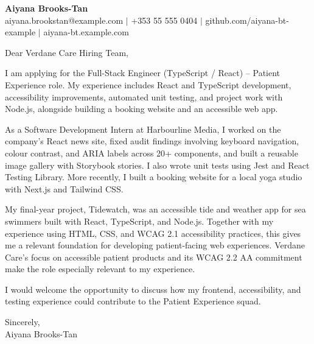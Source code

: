 \documentclass[11pt,a4paper]{article}
\begin{document}
{\large\bfseries Aiyana Brooks-Tan}\\
aiyana.brookstan@example.com $\mid$ +353 55 555 0404 $\mid$ github.com/aiyana-bt-example $\mid$ aiyana-bt.example.com

Dear Verdane Care Hiring Team,

I am applying for the Full-Stack Engineer (TypeScript / React) -- Patient Experience role. My experience includes React and TypeScript development, accessibility improvements, automated unit testing, and project work with Node.js, alongside building a booking website and an accessible web app.

As a Software Development Intern at Harbourline Media, I worked on the company’s React news site, fixed audit findings involving keyboard navigation, colour contrast, and ARIA labels across 20+ components, and built a reusable image gallery with Storybook stories. I also wrote unit tests using Jest and React Testing Library. More recently, I built a booking website for a local yoga studio with Next.js and Tailwind CSS.

My final-year project, Tidewatch, was an accessible tide and weather app for sea swimmers built with React, TypeScript, and Node.js. Together with my experience using HTML, CSS, and WCAG 2.1 accessibility practices, this gives me a relevant foundation for developing patient-facing web experiences. Verdane Care’s focus on accessible patient products and its WCAG 2.2 AA commitment make the role especially relevant to my experience.

I would welcome the opportunity to discuss how my frontend, accessibility, and testing experience could contribute to the Patient Experience squad.

Sincerely,\\
Aiyana Brooks-Tan
\end{document}
